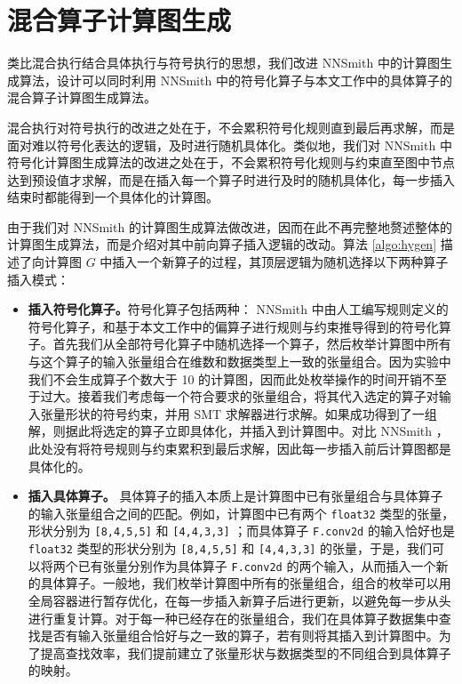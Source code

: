 \section{混合算子计算图生成}

类比混合执行结合具体执行与符号执行的思想，我们改进 NNSmith 中的计算图生成算法，设计可以同时利用 NNSmith 中的符号化算子与本文工作中的具体算子的混合算子计算图生成算法。

混合执行对符号执行的改进之处在于，不会累积符号化规则直到最后再求解，而是面对难以符号化表达的逻辑，及时进行随机具体化。类似地，我们对 NNSmith 中符号化计算图生成算法的改进之处在于，不会累积符号化规则与约束直至图中节点达到预设值才求解，而是在插入每一个算子时进行及时的随机具体化，每一步插入结束时都能得到一个具体化的计算图。

由于我们对 NNSmith 的计算图生成算法做改进，因而在此不再完整地赘述整体的计算图生成算法，而是介绍对其中前向算子插入逻辑的改动。算法 \ref{algo:hygen} 描述了向计算图 $G$ 中插入一个新算子的过程，其顶层逻辑为随机选择以下两种算子插入模式：
\begin{itemize}
    \item \textbf{插入符号化算子。}符号化算子包括两种： NNSmith 中由人工编写规则定义的符号化算子，和基于本文工作中的偏算子进行规则与约束推导得到的符号化算子。首先我们从全部符号化算子中随机选择一个算子，然后枚举计算图中所有与这个算子的输入张量组合在维数和数据类型上一致的张量组合。因为实验中我们不会生成算子个数大于 10 的计算图，因而此处枚举操作的时间开销不至于过大。接着我们考虑每一个符合要求的张量组合，将其代入选定的算子对输入张量形状的符号约束，并用 SMT 求解器进行求解。如果成功得到了一组解，则据此将选定的算子立即具体化，并插入到计算图中。对比 NNSmith ，此处没有将符号规则与约束累积到最后求解，因此每一步插入前后计算图都是具体化的。
    \item \textbf{插入具体算子。} 具体算子的插入本质上是计算图中已有张量组合与具体算子的输入张量组合之间的匹配。例如，计算图中已有两个 \texttt{float32} 类型的张量，形状分别为 \texttt{[8,4,5,5]} 和 \texttt{[4,4,3,3]} ；而具体算子 \texttt{F.conv2d} 的输入恰好也是 \texttt{float32} 类型的形状分别为 \texttt{[8,4,5,5]} 和 \texttt{[4,4,3,3]} 的张量，于是，我们可以将两个已有张量分别作为具体算子 \texttt{F.conv2d} 的两个输入，从而插入一个新的具体算子。一般地，我们枚举计算图中所有的张量组合，组合的枚举可以用全局容器进行暂存优化，在每一步插入新算子后进行更新，以避免每一步从头进行重复计算。对于每一种已经存在的张量组合，我们在具体算子数据集中查找是否有输入张量组合恰好与之一致的算子，若有则将其插入到计算图中。为了提高查找效率，我们提前建立了张量形状与数据类型的不同组合到具体算子的映射。
\end{itemize}


